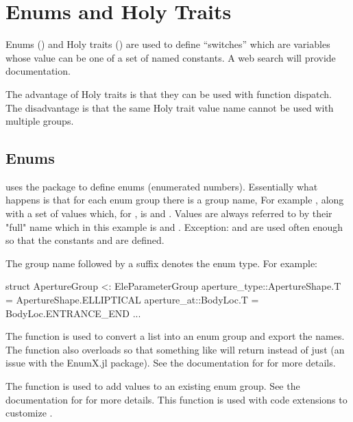 \chapter{Enums and Holy Traits}
\label{c:enums}

Enums () and Holy traits () are used to define ``switches'' which are
variables whose value can be one of a set of named constants. 
A web search will provide documentation. 

The advantage of Holy traits is that they can be used with function dispatch. The disadvantage is
that the same Holy trait value name cannot be used with multiple groups.

\section{Enums}
\label{s:enums}

\accellat uses the package  to define enums (enumerated numbers).
Essentially what happens is that for each enum group there is a group name, For example ,
along with a set of values which, for , is  and . Values
are always referred to by their "full" name which in this example is  and
. Exception:  and  are
used often enough so that the constants  and  are defined.

The group name followed by a  suffix denotes the enum type.
For example:
\begin{example}
  struct ApertureGroup <: EleParameterGroup
    aperture_type::ApertureShape.T = ApertureShape.ELLIPTICAL
    aperture_at::BodyLoc.T = BodyLoc.ENTRANCE_END
    ...
\end{example}

The  function is used to convert a list into an enum group and export the names.
The  function also overloads  so that something like  
will return  instead of just  (an issue with the EnumX.jl package). 
See the documentation for  for more details.

The  function is used to add values to an existing enum group. See the documentation for
 for more details. This function is used with code extensions to customize \accellat.

